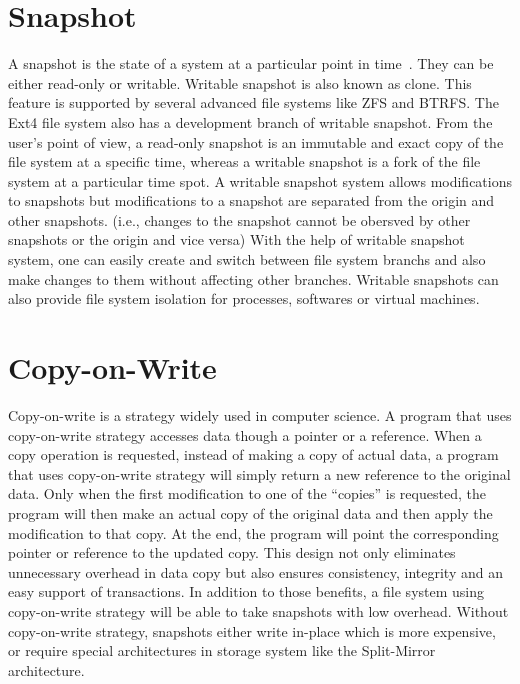 \section{Snapshot}

    A snapshot is the state of a system at a particular point in time~\cite{btrfscow}. They can be either read-only or writable. Writable snapshot is also known as clone. This feature is  supported by several advanced file systems like ZFS and BTRFS. The Ext4 file system also has a development branch of writable snapshot. From the user’s point of view, a read-only snapshot is an immutable and exact copy of the file system at a specific time, whereas a writable snapshot is a fork of the file system at a particular time spot. A writable snapshot system allows modifications to snapshots but modifications to a snapshot are separated from the origin and other snapshots. (i.e., changes to the snapshot cannot be obersved by other snapshots or the origin and vice versa) With the help of writable snapshot system, one can easily create and switch between file system branchs and also make changes to them without affecting other branches. Writable snapshots can also provide file system isolation for processes, softwares or virtual machines.

\section{Copy-on-Write}

    Copy-on-write is a strategy widely used in computer science. A program that uses copy-on-write strategy accesses data though a pointer or a reference. When a copy operation is requested, instead of making a copy of actual data, a program that uses copy-on-write strategy will simply return a new reference to the original data. Only when the first modification to one of the ``copies'' is requested, the program will then make an actual copy of the original data and then apply the modification to that copy. At the end, the program will point the corresponding pointer or reference to the updated copy. This design not only eliminates unnecessary overhead in data copy but also ensures consistency, integrity and an easy support of transactions. In addition to those benefits, a file system using copy-on-write strategy will be able to take snapshots with low overhead. Without copy-on-write strategy, snapshots either write in-place which is more expensive, or require special architectures in storage system like the Split-Mirror architecture.

